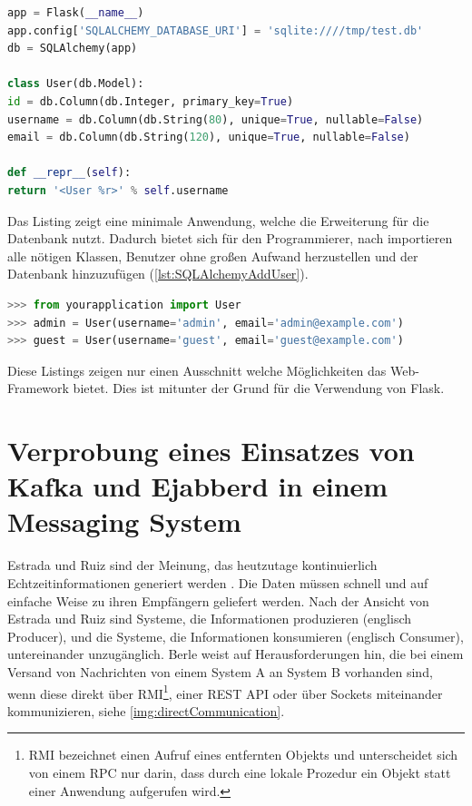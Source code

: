 \documentclass[a4paper,titlepage,halfparskip,12pt]{scrreprt}
\begin{document}
\begin{onehalfspacing}
\begin{lstlisting}[language=Python,caption=Example Listing of Flask-SQLAlchemy,label={lst:SQLAlchemyMinApp}]
app = Flask(__name__)
app.config['SQLALCHEMY_DATABASE_URI'] = 'sqlite:////tmp/test.db'
db = SQLAlchemy(app)

class User(db.Model):
id = db.Column(db.Integer, primary_key=True)
username = db.Column(db.String(80), unique=True, nullable=False)
email = db.Column(db.String(120), unique=True, nullable=False)

def __repr__(self):
return '<User %r>' % self.username
\end{lstlisting}
Das Listing zeigt eine minimale Anwendung, welche die Erweiterung für die Datenbank nutzt. Dadurch bietet sich für den Programmierer, nach importieren alle nötigen Klassen, Benutzer ohne großen Aufwand herzustellen und der Datenbank hinzuzufügen (\autoref{lst:SQLAlchemyAddUser}).
\begin{lstlisting}[language=Python,caption=Hinzufügen eines Objektes in die Datenbanktabelle,label={lst:SQLAlchemyAddUser}]
>>> from yourapplication import User
>>> admin = User(username='admin', email='admin@example.com')
>>> guest = User(username='guest', email='guest@example.com')
\end{lstlisting}
Diese Listings zeigen nur einen Ausschnitt welche Möglichkeiten das Web-Framework bietet. Dies ist mitunter der Grund für die Verwendung von Flask.\cite{FlaskDoc}
\pagebreak

\chapter{Verprobung eines Einsatzes von Kafka und Ejabberd in einem Messaging System}
\label{chap:VerprbungIMS}

Estrada und Ruiz sind der Meinung, das heutzutage kontinuierlich Echtzeitinformationen generiert werden \cite{estradaRuiz2016}. Die Daten müssen schnell und auf einfache Weise zu ihren Empfängern geliefert werden. Nach der Ansicht von Estrada und Ruiz \cite{estradaRuiz2016} sind Systeme, die Informationen produzieren (englisch Producer), und die Systeme, die Informationen konsumieren (englisch Consumer), untereinander unzugänglich. Berle \cite{berleKafkaOverview} weist auf Herausforderungen hin, die bei einem Versand von Nachrichten von einem System A an System B vorhanden sind, wenn diese direkt über \acs{RMI}\footnote{\ac{RMI} bezeichnet einen Aufruf eines entfernten Objekts und unterscheidet sich von einem \ac{RPC} nur darin, dass durch eine lokale Prozedur ein Objekt statt einer Anwendung aufgerufen wird.\cite[S.41]{andrew2008verteilte}}, einer \acs{REST} \acs{API} oder über Sockets miteinander kommunizieren, siehe \autoref{img:directCommunication}.


\end{onehalfspacing}
\end{document}
